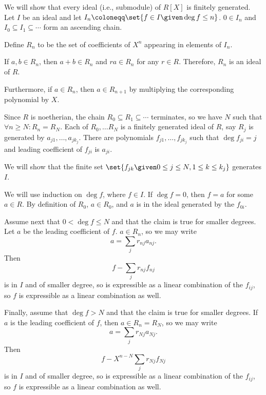 We will show that every ideal (i.e., submodule) of $R[X]$ is finitely generated.
Let $I$ be an ideal and let $I_n\coloneqq \set{f \in I\given \deg f\leq n}$.
$0 \in I_n$ and $I_0 \subseteq I_1 \subseteq\cdots$ form an ascending chain.

Define $R_n$ to be the set of coefficients of $X^n$ appearing in elements of $I_n$.

If $a, b \in R_n$, then $a + b \in R_n$ and $ra \in R_n$ for any $r \in R$. Therefore,
$R_n$ is an ideal of $R$.

Furthermore, if $a \in R_n$, then $a \in R_{n + 1}$ by multiplying the corresponding
polynomial by $X$.

Since $R$ is noetherian, the chain $R_0 \subseteq R_1 \subseteq \cdots$ terminates,
so we have $N$ such that $\forall n\geq N\colon R_n = R_N$. Each of
$R_0, \ldots R_N$ is a finitely generated ideal of $R$, say $R_j$ is generated by
$a_{j1}, \ldots, a_{jk_j}$. There are polynomials $f_{j1}, \ldots, f_{jk_j}$
such that $\deg f_{ji} = j$ and leading coefficient of $f_{ji}$ is $a_{ji}$.

We will show that the finite set $\set{f_{jk}\given 0\leq j\leq N, 1\leq k\leq k_j}$
generates $I$.

We will use induction on $\deg f$, where $f \in I$. If $\deg f = 0$, then
$f = a$ for some $a \in R$. By definition of $R_0$, $a \in R_0$, and $a$ is
in the ideal generated by the $f_{0i}$.

Assume next that $0 < \deg f \leq N$ and that the claim is true for smaller degrees.
Let $a$ be the leading coefficient of $f$. $a \in R_n$, so we may write
\[ a = \sum_j r_{nj}a_{nj}. \] Then \[ f - \sum_j r_{nj}f_{nj} \] is in $I$ and of smaller
degree, so is expressible as a linear combination of the $f_{ij}$, so $f$ is
expressible as a linear combination as well.

Finally, assume that $\deg f > N$ and that the claim is true for smaller degrees.
If $a$ is the leading coefficient of $f$, then $a \in R_n = R_N$, so we may write
\[ a = \sum_j r_{Nj}a_{Nj}. \] Then \[ f - X^{n-N} \sum_j r_{Nj}f_{Nj} \] is in $I$ and of smaller
degree, so is expressible as a linear combination of the $f_{ij}$, so $f$ is
expressible as a linear combination as well.
